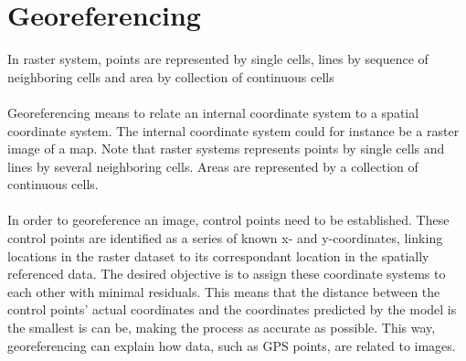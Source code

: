 \section{Georeferencing}
In raster system, points are represented by single cells, lines by sequence of neighboring cells and area by collection of continuous cells
\\\\
Georeferencing means to relate an internal coordinate system to a spatial coordinate system. The internal coordinate system could for instance be a raster image of a map. 
Note that raster systems represents points by single cells and lines by several neighboring cells. Areas are represented by a collection of continuous cells. 
\\\\
In order to georeference an image, control points need to be established. These control points are identified as a series of known x- and y-coordinates, linking locations in the raster dataset to its correspondant location in the spatially referenced data. The desired objective is to assign these coordinate systems to each other with minimal residuals. This means that the distance between the control points’ actual coordinates and the coordinates predicted by the model is the smallest is can be, making the process as accurate as possible. This way, georeferencing can explain how data, such as GPS points, are related to images.

\vspace{1.3cm}
